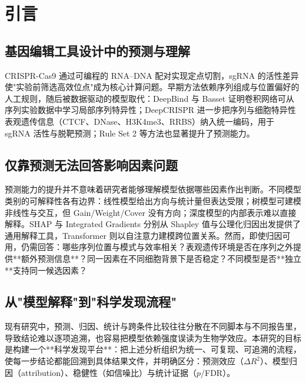 \section{引言}
\label{sec:intro}

\subsection{基因编辑工具设计中的预测与理解}

CRISPR-Cas9 通过可编程的 RNA--DNA 配对实现定点切割，sgRNA 的活性差异使"实验前筛选高效位点"成为核心计算问题\citep{Jinek2012Science,Cong2013Science}。早期方法依赖序列组成与位置偏好的人工规则\citep{Doench2014NatBiotechnol,MorenoMateos2015NatMethods}，随后被数据驱动的模型取代：DeepBind 与 Basset 证明卷积网络可从序列实验数据中学习局部序列特异性\citep{Alipanahi2015NatBiotechnol,Kelley2016GenomeRes}；DeepCRISPR 进一步把序列与细胞特异性表观遗传信息（CTCF、DNase、H3K4me3、RRBS）纳入统一编码，用于 sgRNA 活性与脱靶预测\citep{Chuai2018GenomeBiol}；Rule Set 2 等方法也显著提升了预测能力\citep{Doench2016NatBiotechnol}。

\subsection{仅靠预测无法回答影响因素问题}

预测能力的提升并不意味着研究者能够理解模型依据哪些因素作出判断。不同模型类别的可解释性各有边界：线性模型给出方向与统计量但表达受限；树模型可建模非线性与交互\citep{Chen2016KDD}，但 Gain/Weight/Cover 没有方向；深度模型的内部表示难以直接解释。SHAP 与 Integrated Gradients 分别从 Shapley 值与公理化归因出发提供了通用解释工具\citep{Lundberg2017NeurIPS,Sundararajan2017ICML}，Transformer 则以自注意力建模跨位置关系\citep{Vaswani2017NeurIPS}。然而，即使归因可用，仍需回答：哪些序列位置与模式与效率相关？表观遗传环境是否在序列之外提供**额外预测信息**？同一因素在不同细胞背景下是否稳定？不同模型是否**独立**支持同一候选因素？

\subsection{从"模型解释"到"科学发现流程"}

现有研究中，预测、归因、统计与跨条件比较往往分散在不同脚本与不同报告里，导致结论难以逐项追溯，也容易把模型依赖强度误读为生物学效应。本研究的目标是构建一个**科学发现平台**：把上述分析组织为统一、可复现、可追溯的流程，使每一步结论都能回溯到具体结果文件，并明确区分：预测效应（$\Delta R^{2}$）、模型归因（attribution）、稳健性（如信噪比）与统计证据（$p$/FDR）。

